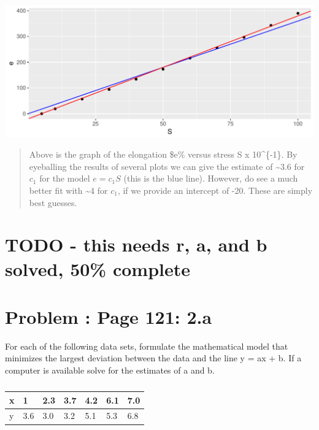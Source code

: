 \documentclass[]{article}
\begin{document}
\includegraphics{Homework_3_files/figure-latex/unnamed-chunk-1-1.pdf}

\begin{quote}
Above is the graph of the elongation \$e\% versus stress S x
10\^{}\{-1\}. By eyeballing the results of several plots we can give the
estimate of \textasciitilde{}3.6 for \(c_1\) for the model \(e = c_1S\)
(this is the blue line). However, do see a much better fit with
\textasciitilde{}4 for \(c_1\), if we provide an intercept of -20. These
are simply best guesses.
\end{quote}

\section{TODO - this needs r, a, and b solved, 50\%
complete}\label{todo---this-needs-r-a-and-b-solved-50-complete}

\section{Problem : Page 121: 2.a}\label{problem-page-121-2.a}

For each of the following data sets, formulate the mathematical model
that minimizes the largest deviation between the data and the line y =
ax + b. If a computer is available solve for the estimates of a and b.

\begin{table}[!htbp]
\centering
\caption{}
\label{my-label}
\begin{tabular}{l|llllll}
x & 1   & 2.3 & 3.7 & 4.2 & 6.1 & 7.0 \\ \hline
y & 3.6 & 3.0 & 3.2 & 5.1 & 5.3 & 6.8  
\end{tabular}
\end{table}
\end{document}
